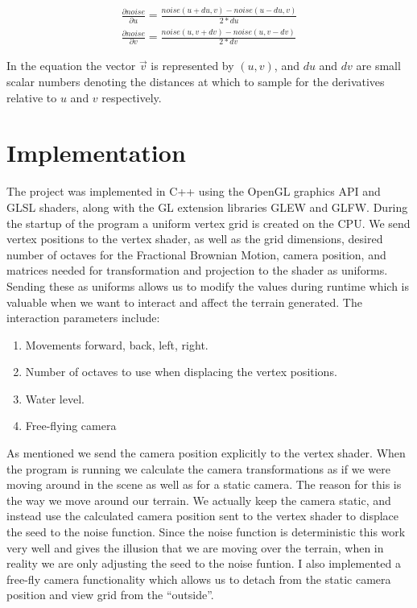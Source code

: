 \documentclass[12pt]{article}
\begin{document}
\begin{equation}
\begin{split}
\frac{\partial noise}{\partial u} = \frac{noise(u+du, v)-noise(u-du,v)}{2*du} \\
\frac{\partial noise}{\partial v} = \frac{noise(u, v+dv)-noise(u,v-dv)}{2*dv}
\label{eq:normals}
\end{split}
\end{equation}

In the equation the vector $\vec{v}$ is represented by $(u,v)$, and $du$ and $dv$ are small scalar numbers denoting the distances at which to sample for the derivatives relative to $u$ and $v$ respectively.
 
\section{Implementation}
The project was implemented in C++ using the OpenGL graphics API and GLSL shaders, along with the GL extension libraries GLEW and GLFW. During the startup of the program a uniform vertex grid is created on the CPU. We send vertex positions to the vertex shader, as well as the grid dimensions, desired number of octaves for the Fractional Brownian Motion, camera position, and matrices needed for transformation and projection to the shader as uniforms. Sending these as uniforms allows us to modify the values during runtime which is valuable when we want to interact and affect the terrain generated. The interaction parameters include:

\begin{enumerate}
  \item Movements forward, back, left, right.
  \item Number of octaves to use when displacing the vertex positions.
  \item Water level.
  \item Free-flying camera
\end{enumerate}

As mentioned we send the camera position explicitly to the vertex shader. When the program is running we calculate the camera transformations as if we were moving around in the scene as well as for a static camera. The reason for this is the way we move around our terrain. We actually keep the camera static, and instead use the calculated camera position sent to the vertex shader to displace the seed to the noise function. Since the noise function is deterministic this work very well and gives the illusion that we are moving over the terrain, when in reality we are only adjusting the seed to the noise funtion. I also implemented a free-fly camera functionality which allows us to detach from the static camera position and view grid from the ``outside''.
\end{document}
